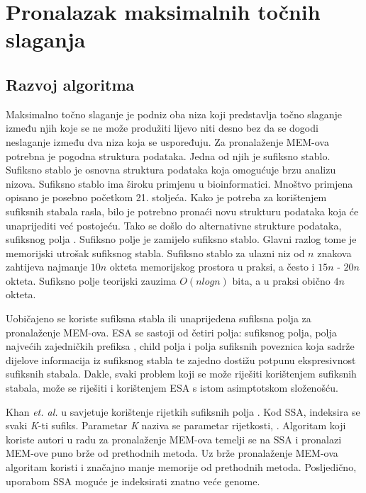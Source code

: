 \documentclass[times, utf8, seminar, numeric]{fer}
\begin{document}
\chapter{Pronalazak maksimalnih točnih slaganja} 
\label{ch:mems}

\section{Razvoj algoritma}

Maksimalno točno slaganje  je podniz oba niza koji predstavlja točno slaganje između njih koje se ne može produžiti lijevo niti desno bez da se dogodi neslaganje između dva niza koja se uspoređuju. Za pronalaženje MEM-ova potrebna je pogodna struktura podataka. Jedna od njih je sufiksno stablo. Sufiksno stablo je osnovna struktura podataka koja omogućuje brzu analizu nizova. Sufiksno stablo ima široku primjenu u bioinformatici. Mnoštvo primjena opisano je posebno početkom 21. stoljeća. Kako je potreba za korištenjem sufiksnih stabala rasla, bilo je potrebno pronaći novu strukturu podataka koja će unaprijediti već postojeću. Tako se došlo do alternativne strukture podataka, sufiksnog polja . Sufiksno polje je zamijelo sufiksno stablo. Glavni razlog tome je memorijski utrošak sufiksnog stabla. Sufiksno stablo za ulazni niz od $n$ znakova zahtijeva najmanje $10n$ okteta memorijskog prostora u praksi, a često i $15n$ - $20n$ okteta. Sufiksno polje teorijski zauzima $O(n log n)$ bita, a u praksi obično $4n$ okteta.

Uobičajeno se koriste sufiksna stabla ili unaprijeđena sufiksna polja  za pronalaženje MEM-ova. ESA se sastoji od četiri polja: sufiksnog polja, polja najvećih zajedničkih prefiksa , child polja i polja sufiksnih poveznica  koja sadrže dijelove informacija iz sufiksnog stabla te zajedno dostižu potpunu ekspresivnost sufiksnih stabala. Dakle, svaki problem koji se može riješiti korištenjem sufiksnih stabala, može se riješiti i korištenjem ESA s istom asimptotskom složenošću.

Khan \textit{et. al.} u \cite{ssa} savjetuje korištenje rijetkih sufiksnih polja . Kod SSA, indeksira se svaki \textit{K}-ti sufiks. Parametar \textit{K} naziva se parametar rijetkosti, . Algoritam koji koriste autori u radu \cite{ssa} za pronalaženje MEM-ova temelji se na SSA i pronalazi MEM-ove puno brže od prethodnih metoda. Uz brže pronalaženje MEM-ova algoritam koristi i značajno manje memorije od prethodnih metoda. Posljedično, uporabom SSA moguće je indeksirati znatno veće genome.
\end{document}
